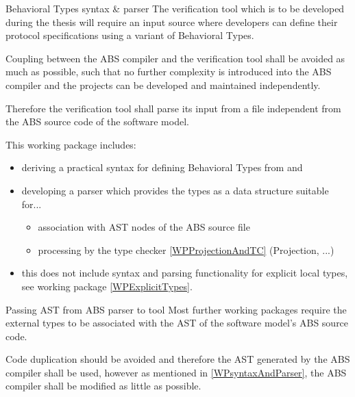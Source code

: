 \documentclass[paper=a4,nochapname,accentcolor=tud9c]{tudexercise}
\makeatletter
\def\namedlabel#1#2{\begingroup
    #1%
    \def\@currentlabel{\thedescriptcount}%
    \phantomsection\label{#2}\endgroup
}
\newcounter{descriptcount}
\renewcommand*\thedescriptcount{[\Alph{descriptcount}]}}
\renewcommand*\thedescriptcount{\roman{descriptcount}}}
\makeatother
\begin{document}
\begin{enumdescript}
\item[\namedlabel{Behavioral Types syntax \& parser}{WPsyntaxAndParser}]%
    The verification tool which is to be developed during the thesis will require
    an input source where developers can define their protocol specifications using a variant of Behavioral Types.

    Coupling between the ABS compiler and the verification tool shall be avoided
    as much as possible, such that no further complexity is introduced into the ABS
    compiler and the projects can be developed and maintained independently.
    
    Therefore the verification tool shall parse its input from a file independent
    from the ABS source code of the software model.

    This working package includes:
    \begin{itemize}
      \item deriving a practical syntax for defining Behavioral Types from \cite{kamburjan2018stateful} and \cite{kamburjan2016session}
      \item developing a parser which provides the types as a data structure
        suitable for...
      \begin{itemize}
        \item association with AST nodes of the ABS source file
        \item processing by the type checker \ref{WPProjectionAndTC} (Projection, ...)
      \end{itemize}
      \item this does not include syntax and parsing functionality for explicit
        local types, see working package \ref{WPExplicitTypes}.
    \end{itemize}
  \item[\namedlabel{Passing AST from ABS parser to tool}{WPPassAST}]%
    Most further working packages require the external types to be associated with
    the AST of the software model's ABS source code.

    Code duplication should be avoided and therefore the AST generated by the
    ABS compiler shall be used, however as mentioned in \ref{WPsyntaxAndParser},
    the ABS compiler shall be modified as little as possible.


\end{enumdescript}
\end{document}
